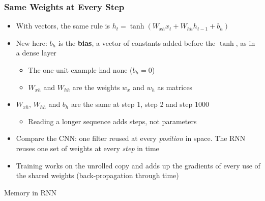\begin{frame}[fragile] \frametitle{Same Weights at Every Step}
\begin{itemize}
\item With vectors, the same rule is $h_t = \tanh(W_{xh} x_t + W_{hh} h_{t-1} + b_h)$
\item New here: $b_h$ is the \textbf{bias}, a vector of constants added before the $\tanh$, as in a dense layer
  \begin{itemize}
  \item The one-unit example had none ($b_h = 0$)
  \item $W_{xh}$ and $W_{hh}$ are the weights $w_x$ and $w_h$ as matrices
  \end{itemize}
\item $W_{xh}$, $W_{hh}$ and $b_h$ are the same at step 1, step 2 and step 1000
  \begin{itemize}
  \item Reading a longer sequence adds steps, not parameters
  \end{itemize}
\item Compare the CNN: one filter reused at every \emph{position} in space. The RNN reuses one set of weights at every \emph{step} in time
\item Training works on the unrolled copy and adds up the gradients of every use of the shared weights (back-propagation through time)
\end{itemize}
\end{frame}

\begin{frame}
  \begin{center}
    {\Large Memory in RNN}
  \end{center}
\end{frame}


